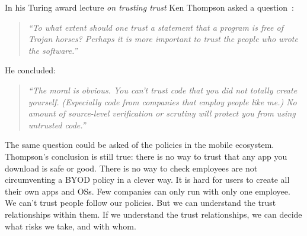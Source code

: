 \documentclass[thesis.tex]{subfiles}
\begin{document}
\hspace{1em}

\noindent In his Turing award lecture \emph{on trusting trust} Ken Thompson asked a
question~\cite{ken_thompson_reflections_1984}:
\begin{quotation}\itshape\noindent
  ``To what extent should one trust a statement that a program is free of Trojan
  horses? Perhaps it is more important to trust the people who wrote the
  software.''
\end{quotation}
He concluded:
\begin{quotation}\itshape\noindent
  ``The moral is obvious. You can't trust code that you did not totally create
  yourself. (Especially code from companies that employ people like me.)
  No amount of source-level verification or scrutiny will protect you from using untrusted code.''
\end{quotation} 
The same question could be asked of the policies in the mobile
ecosystem. Thompson's conclusion is still true: there is no way to trust that
any app you download is safe or good. There is no way to check employees
are not circumventing a BYOD policy in a clever way. It is hard
for users to create all their own apps and OSs. Few companies can only run
with only one employee. We can't trust people follow our policies. But we can
understand the trust relationships within them. If we understand the trust
relationships, we can decide what risks we take, and with whom.
\end{document}
